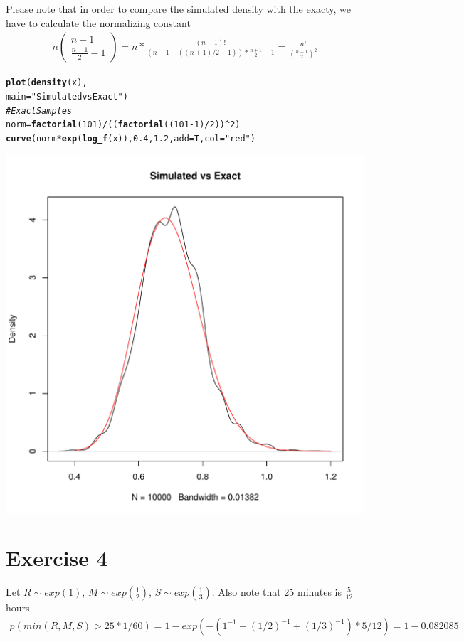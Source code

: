 \documentclass{article}\usepackage[]{graphicx}\usepackage[]{color}
\makeatletter
\newcommand{\hlnum}[1]{\textcolor[rgb]{0.686,0.059,0.569}{#1}}%
\newcommand{\hlstr}[1]{\textcolor[rgb]{0.192,0.494,0.8}{#1}}%
\newcommand{\hlcom}[1]{\textcolor[rgb]{0.678,0.584,0.686}{\textit{#1}}}%
\newcommand{\hlopt}[1]{\textcolor[rgb]{0,0,0}{#1}}%
\newcommand{\hlstd}[1]{\textcolor[rgb]{0.345,0.345,0.345}{#1}}%
\newcommand{\hlkwb}[1]{\textcolor[rgb]{0.69,0.353,0.396}{#1}}%
\newcommand{\hlkwc}[1]{\textcolor[rgb]{0.333,0.667,0.333}{#1}}%
\newcommand{\hlkwd}[1]{\textcolor[rgb]{0.737,0.353,0.396}{\textbf{#1}}}%
\newenvironment{kframe}{%
 \def\at@end@of@kframe{}%
 \ifinner\ifhmode%
  \def\at@end@of@kframe{\end{minipage}}%
  \begin{minipage}{\columnwidth}%
 \fi\fi%
 \def\FrameCommand##1{\hskip\@totalleftmargin \hskip-\fboxsep
 \colorbox{shadecolor}{##1}\hskip-\fboxsep
     \hskip-\linewidth \hskip-\@totalleftmargin \hskip\columnwidth}%
 \MakeFramed {\advance\hsize-\width
   \@totalleftmargin\z@ \linewidth\hsize
   \@setminipage}}%
 {\par\unskip\endMakeFramed%
 \at@end@of@kframe}
\newenvironment{knitrout}{}{} %
\makeatother
\begin{document}
Please note that in order to compare the simulated density with the exacty, we have to calculate the normalizing constant
\begin{equation}
\begin{split}
n\left(\begin{array}{c}
n-1\\
\frac{n+1}{2}-1
\end{array}\right) = n*\frac{(n-1)!}{(n-1-((n+1)/2-1))*\frac{n+1}{2}-1}= \frac{n!}{(\frac{n-1}{2})^2}
\end{split}
\end{equation}
\begin{knitrout}
\color{fgcolor}\begin{kframe}
\begin{alltt}
\hlkwd{plot}\hlstd{(}\hlkwd{density}\hlstd{(x),}
     \hlkwc{main}\hlstd{=}\hlstr{"Simulated vs Exact"}\hlstd{)}
\hlcom{#Exact Samples}
\hlstd{norm} \hlkwb{=} \hlkwd{factorial}\hlstd{(}\hlnum{101}\hlstd{)}\hlopt{/}\hlstd{((}\hlkwd{factorial}\hlstd{((}\hlnum{101}\hlopt{-}\hlnum{1}\hlstd{)}\hlopt{/}\hlnum{2}\hlstd{))}\hlopt{^}\hlnum{2}\hlstd{)}
\hlkwd{curve}\hlstd{(norm}\hlopt{*}\hlkwd{exp}\hlstd{(}\hlkwd{log_f}\hlstd{(x)),}\hlnum{0.4}\hlstd{,}\hlnum{1.2}\hlstd{,}\hlkwc{add}\hlstd{=T,}\hlkwc{col}\hlstd{=}\hlstr{"red"}\hlstd{)}
\end{alltt}
\end{kframe}
\includegraphics[width=0.60\linewidth]{figure/unnamed-chunk-4-1} 

\end{knitrout}
\section*{Exercise 4}
Let $R \sim exp(1)$, $M \sim exp(\frac{1}{2})$, $S \sim exp(\frac{1}{3})$. Also note that 25 minutes is $\frac{5}{12}$ hours. 
\begin{equation}
\begin{split}
p(min(R,M,S)>25*1/60) = 1-exp(-(1^{-1}+(1/2)^{-1}+(1/3)^{-1})*5/12)=1-0.082085
\end{split}
\end{equation}
\end{document}
